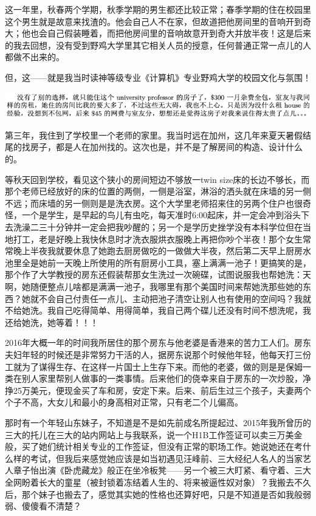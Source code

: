 \documentclass[9pt, b5paper]{article}
\begin{document}
这一年里，秋春两个学期，秋季学期的男生都还比较正常；春季学期的住在校园里这个男生就是故意来找渣的。他会自己人不在家，但故道把他房间里的音响开到奇大；他也会自己假装睡着，而把他房间里的音响故意开到奇大并放半夜！这是后来的我去回想，没有受到野鸡大学里其它相关人员的授意，任何普通正常一点儿的人都做不出来的。

但，这——就是我当时读神等级专业《计算机》专业野鸡大学的校园文化与氛围！

\begin{center}
\includegraphics[width=.9\linewidth]{./pic/backups_plans_20210429_143938.png}
\end{center}

第三年，我住到了学校里一个老师的家里。我当时远在加州，这几年来夏天暑假结尾的找房子，都是人在加州找的。这次也是，并不是了解房间的构造、设计什么的。

等秋天回到学校，看见这个狭小的房间短边不够放一twin size床的长边不够长，而那个老师已经放好的床的位置的两侧，一侧是浴室，淋浴的洒头就在床墙的另一侧不远；而床墙的另一侧则是是洗衣房。这个大学里老师招来住的另两个住户也很奇怪，一个是学生，是早起的鸟儿有虫吃，每天准时6:00起床，并一定会冲到浴头下去洗澡二三十分钟并一定会把我吵醒的；另一个是学历史挫学没有本科学位但在当地打工，老是好晚上我快休息时才洗衣服烘衣服晚上再把你吵个半夜！那个女生常常晚上半夜我就要休息了她跑去厨房做吃的一做做大半夜，然后第二天早上厨房水池里全是她前一天晚上所使用的所有厨房小工具，塞上满满一池子！更搞笑的是，那个作了大学教授的房东还假装帮那女生洗过一次碗碟，试图说服我也帮她洗：天啊，她随便整点儿啥都是满满一池子，我哪里有那个美国时间来帮她洗那些她的东西？她就不会自己付责任一点儿、主动把池子清空让别人也有使用的空间吗？我就不给她洗。我自己吃得简单、用得简单，我自己两个碟儿还没有时间不想洗呢，我还给她洗，她等着！！！

2016年大概一年的时间我所居住的那个房东与他老婆是香港来的苦力工人们。房东夫妇年轻的时候还是非常努力干活的人，据房东说那个时候他年轻，他每天打三份工就为了谋得生存、在这样一片国士上生存下来。而他的老婆，做的则是是保姆一类在别人家里帮别人做事的一类事情。后来他们的侥幸来自于房东的一次炒股，净挣25万美元，便现金买了车和房，安定下来。后来、前后生过三个孩子，夫妻两个个子不高，大女儿和最小的身高相对正常，只有老二个儿偏高。

那时有一个年轻山东妹子，不知道是不是如先前成名所提起过、2015年我所曾历的三大的托儿在三大的站内网站上与我联系，说一个H1B工作签证可以卖三万美金般，买了她们统计相关专业的工作签证，但没有正常的职场工作。她说她还在考什么样的考试，但我后来感觉她应该是如当初遇见汪峰前、三大经纪人名人的当家艺人章子怡出演《卧虎藏龙》般正在坐冷板凳——另一个被三大盯紧、看守着、三大全网盼着长大的童星（被封锁着冻结着人生的、将来被逼性奴对象）？我搬去不久后，那个妹子也搬去了，感觉其实她的性格也还算好吧，只是不知道是否如我般弱弱、傻傻看不清楚？
\end{document}

